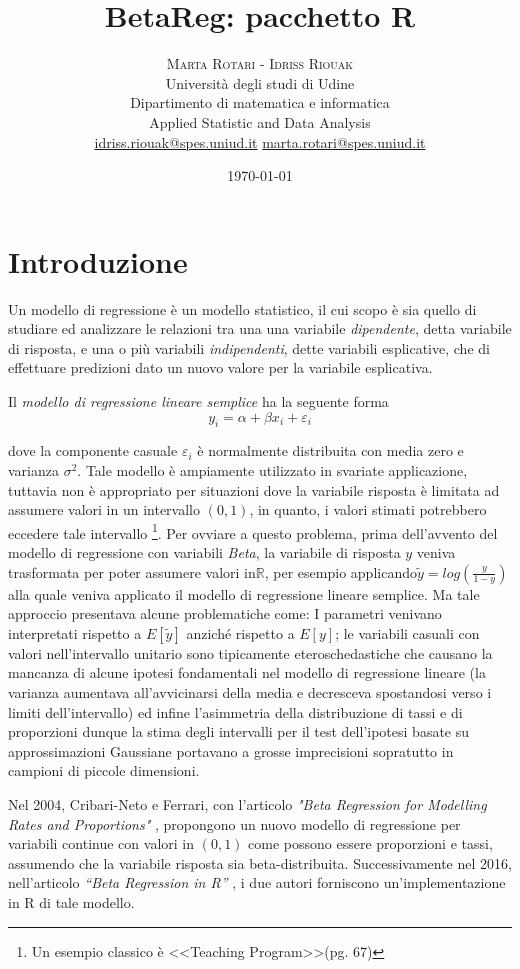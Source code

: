 \documentclass[twoside,twocolumn]{article}
\title{BetaReg: pacchetto R}
\author{
	\textsc{Marta Rotari - Idriss Riouak} \\[1ex] 
	\normalsize Università degli studi di Udine \\ 
	\normalsize Dipartimento di matematica e informatica \\ 
	\normalsize Applied Statistic and Data Analysis\\
	\normalsize \href{mailto:idriss.riouak@spes.uniud.it}{idriss.riouak@spes.uniud.it} 
	\normalsize \href{mailto:marta.rotari@spes.uniud.it}{marta.rotari@spes.uniud.it} 
}
\date{\today}
\begin{document}
	

	\maketitle
	
	\section{Introduzione}
	Un modello di regressione è un modello statistico, il cui scopo è sia quello di studiare ed analizzare le relazioni tra una una variabile \emph{dipendente}, detta variabile di risposta, e una o più variabili \emph{indipendenti}, dette variabili esplicative, che di effettuare predizioni dato un nuovo valore per la variabile esplicativa.
	
	Il \emph{modello di regressione lineare semplice} ha la seguente forma
	\begin{equation}\label{eq:lrm}
		 y_i=\alpha + \beta x_i + \varepsilon_i 
	\end{equation}

	dove la componente casuale $\varepsilon_i$ è normalmente distribuita con media zero e varianza $\sigma^2$.
	Tale modello è ampiamente utilizzato in svariate applicazione, tuttavia non è appropriato per situazioni dove la variabile risposta è limitata ad assumere valori in un intervallo $(0,1)$, in quanto, i valori stimati potrebbero eccedere tale intervallo \footnote{Un esempio classico è <<Teaching Program>>\cite{PV}(pg. 67)}. Per ovviare a questo problema, prima dell'avvento del modello di regressione con variabili \textit{Beta}, la variabile di risposta $y$ veniva trasformata per poter assumere valori in$\mathbb{R}$, per esempio applicando$\tilde{y}=log(\frac{y}{1-y})$ alla quale veniva applicato il modello di regressione lineare semplice. Ma tale approccio presentava alcune problematiche come: I parametri venivano interpretati rispetto a $E[\tilde{y}]$ anziché rispetto a $E[y]$; le variabili casuali con valori nell'intervallo unitario sono tipicamente eteroschedastiche che causano la mancanza di alcune ipotesi fondamentali nel modello di regressione lineare (la varianza aumentava all'avvicinarsi della media e decresceva spostandosi verso i limiti dell'intervallo) ed infine l'asimmetria della distribuzione di tassi e di proporzioni dunque la stima degli intervalli per il test dell'ipotesi basate su approssimazioni Gaussiane portavano a grosse imprecisioni sopratutto in campioni di piccole dimensioni.

	Nel 2004, Cribari-Neto e Ferrari, con l'articolo \emph{"Beta Regression for Modelling Rates and Proportions"} \cite{2004}, propongono un nuovo modello di regressione per variabili continue con valori in $(0,1)$ come possono essere proporzioni e tassi, assumendo che la variabile risposta sia beta-distribuita. Successivamente nel 2016, nell'articolo \emph{``Beta Regression in R''} \cite{CNF}, i due autori forniscono un'implementazione in R di tale modello.
	
\end{document}
